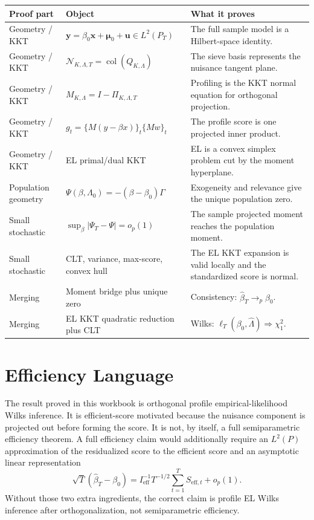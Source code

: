 \documentclass[12pt]{article}
\numberwithin{equation}{section}
\theoremstyle{definition}
\newcommand{\op}{o_p}
\newcommand{\N}{\mathcal N}
\newcommand{\LtwoT}{L^2(P_T)}
\begin{document}
\begin{center}
\begin{tabular}{>{\raggedright\arraybackslash}p{}
                >{\raggedright\arraybackslash}p{}
                >{\raggedright\arraybackslash}p{}}
\toprule
Proof part & Object & What it proves \\
\midrule
Geometry / KKT &
\(\bm y=\beta_0\bm x+\bm\mu_0+\bm u\in\LtwoT\) &
The full sample model is a Hilbert-space identity. \\
\addlinespace
Geometry / KKT &
\(\N_{K,\Lambda,T}=\operatorname{col}(Q_{K,\Lambda})\) &
The sieve basis represents the nuisance tangent plane. \\
\addlinespace
Geometry / KKT &
\(M_{K,\Lambda}=I-\Pi_{K,\Lambda,T}\) &
Profiling is the KKT normal equation for orthogonal projection. \\
\addlinespace
Geometry / KKT &
\(g_t=\{M(y-\beta x)\}_t\{Mw\}_t\) &
The profile score is one projected inner product. \\
\addlinespace
Geometry / KKT &
EL primal/dual KKT &
EL is a convex simplex problem cut by the moment hyperplane. \\
\addlinespace
Population geometry &
\(\Psi(\beta,\Lambda_0)=-(\beta-\beta_0)\Gamma\) &
Exogeneity and relevance give the unique population zero. \\
\addlinespace
Small stochastic &
\(\sup_\beta|\Psi_T-\Psi|=\op(1)\) &
The sample projected moment reaches the population moment. \\
\addlinespace
Small stochastic &
CLT, variance, max-score, convex hull &
The EL KKT expansion is valid locally and the standardized score is normal. \\
\addlinespace
Merging &
Moment bridge plus unique zero &
Consistency: \(\widehat\beta_T\to_p\beta_0\). \\
\addlinespace
Merging &
EL KKT quadratic reduction plus CLT &
Wilks: \(\ell_T(\beta_0,\widehat\Lambda)\Rightarrow\chi_1^2\). \\
\bottomrule
\end{tabular}
\end{center}

\section{Efficiency Language}

The result proved in this workbook is orthogonal profile empirical-likelihood
Wilks inference. It is efficient-score motivated because the nuisance component
is projected out before forming the score. It is not, by itself, a full
semiparametric efficiency theorem. A full efficiency claim would additionally
require an \(L^2(P)\) approximation of the residualized score to the efficient
score and an asymptotic linear representation
\[
    \sqrt T(\widehat\beta_T-\beta_0)
    =I_{\mathrm{eff}}^{-1}T^{-1/2}\sum_{t=1}^T S_{\mathrm{eff},t}+\op(1).
\]
Without those two extra ingredients, the correct claim is profile EL Wilks
inference after orthogonalization, not semiparametric efficiency.
\end{document}

